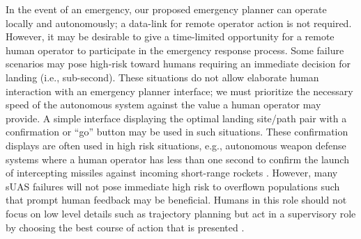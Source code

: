 In the event of an emergency, our proposed emergency planner can operate locally and autonomously; a data-link for remote operator action is not required. However, it may be desirable to give a time-limited opportunity for a remote human operator to participate in the emergency response process. Some failure scenarios may pose high-risk toward humans requiring an immediate decision for landing (i.e., sub-second). These situations do not allow elaborate human interaction with an emergency planner interface; we must prioritize the necessary speed of the autonomous system against the value a human operator may provide. A simple interface displaying the optimal landing site/path pair with a confirmation or ``go'' button may be used in such situations. These confirmation displays are often used in high risk situations, e.g., autonomous weapon defense systems where a human operator has less than one second to confirm the launch of intercepting missiles against incoming short-range rockets \cite{docherty2012losing}. However, many \ac{sUAS} failures will not pose immediate high risk to overflown populations such that prompt human feedback may be beneficial. Humans in this role should not focus on low level details such as trajectory planning but act in a supervisory role by choosing the best course of action that is presented \cite{gutzwiller_human-computer_2015}.

